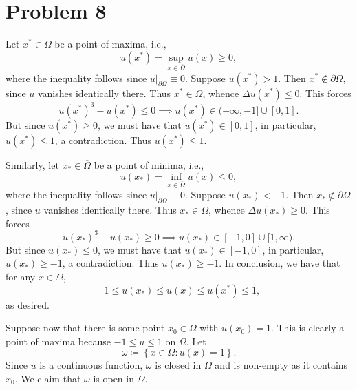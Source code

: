 \documentclass[10pt]{amsart}
\theoremstyle{thmstyle}
\theoremstyle{defstyle}
\renewcommand{\le}{\leqslant}
\renewcommand{\ge}{\geqslant}
\begin{document}
\section{Problem 8}

Let $x^\ast\in\overline\Omega$ be a point of maxima, i.e., 
\begin{equation*}
    u(x^\ast) = \sup_{x\in\overline\Omega} u(x)\ge 0,
\end{equation*}
where the inequality follows since $u|_{\partial\Omega}\equiv 0$.  
Suppose $u(x^\ast) > 1$. Then $x^\ast\notin\partial\Omega$, since $u$ vanishes identically there. Thus $x^\ast\in\Omega$, whence $\Delta u(x^\ast)\le 0$. This forces 
\begin{equation*}
    u(x^\ast)^3 - u(x^\ast)\le 0\implies u(x^\ast)\in (-\infty, -1]\cup[0, 1].
\end{equation*}
But since $u(x^\ast)\ge 0$, we must have that $u(x^\ast)\in [0, 1]$, in particular, $u(x^\ast)\le 1$, a contradiction. Thus $u(x^\ast)\le 1$.

Similarly, let $x_\ast\in\overline\Omega$ be a point of minima, i.e., 
\begin{equation*}
    u(x_\ast) = \inf_{x\in\overline\Omega} u(x)\le 0,
\end{equation*}
where the inequality follows since $u|_{\partial\Omega}\equiv 0$. Suppose $u(x_\ast) < -1$. Then $x_\ast\notin\partial\Omega$, since $u$ vanishes identically there. Thus $x_\ast\in\Omega$, whence $\Delta u(x_\ast)\ge 0$. This forces 
\begin{equation*}
    u(x_\ast)^3 - u(x_\ast) \ge 0\implies u(x_\ast)\in[-1, 0]\cup[1,\infty).
\end{equation*}
But since $u(x_\ast)\le 0$, we must have that $u(x_\ast)\in[-1, 0]$, in particular, $u(x_\ast)\ge -1$, a contradiction. Thus $u(x_\ast)\ge -1$. In conclusion, we have that for any $x\in\Omega$, 
\begin{equation*}
    -1\le u(x_\ast)\le u(x)\le u(x^\ast)\le 1,
\end{equation*}
as desired.

Suppose now that there is some point $x_0\in\Omega$ with $u(x_0) = 1$. This is clearly a point of maxima because $-1\le u\le 1$ on $\Omega$. Let 
\begin{equation*}
    \omega \coloneq\left\{x\in\Omega\colon u(x) = 1\right\}.
\end{equation*}
Since $u$ is a continuous function, $\omega$ is closed in $\Omega$ and is non-empty as it contains $x_0$. We claim that $\omega$ is open in $\Omega$. 
\end{document}
